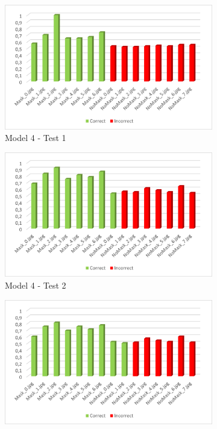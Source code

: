 \documentclass[a4paper,12pt]{article}
\begin{document}
\begin{figure}%
    \centering
    \begin{subfigure}{6cm}
        \includegraphics[width=\linewidth]{images_latex/test4_1.png}
        \caption{Model 4 - Test 1}
    \end{subfigure}
    \qquad
    \begin{subfigure}{6cm}
        \includegraphics[width=\linewidth]{images_latex/test4_2.png}
        \caption{ Model 4 - Test 2}
    \end{subfigure}
    \qquad
    \begin{subfigure}{6cm}
        \includegraphics[width=\linewidth]{images_latex/test4_3.png}

\end{subfigure}
\end{figure}
\end{document}
